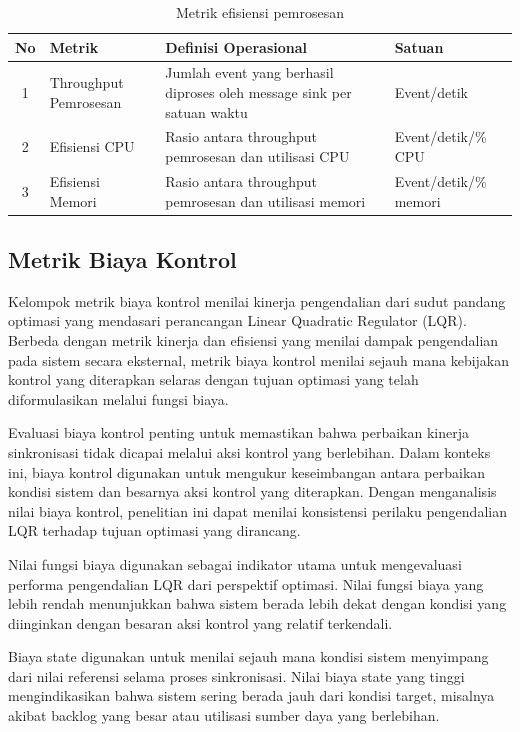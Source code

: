 \begin{table}[H]
    \centering
    \caption{Metrik efisiensi pemrosesan}
    \label{tab:metrik-efisiensi}
    \renewcommand{\arraystretch}{1.4}
    \begin{tabular}{|c|p{3cm}|p{6cm}|p{2.5cm}|}
    \hline
    \textbf{No} & \textbf{Metrik} & \textbf{Definisi Operasional} & \textbf{Satuan} \\
    \hline
    1 & Throughput Pemrosesan & Jumlah event yang berhasil diproses oleh message sink per satuan waktu & Event/detik \\
    \hline
    2 & Efisiensi CPU & Rasio antara throughput pemrosesan dan utilisasi CPU & Event/detik/\% CPU \\
    \hline
    3 & Efisiensi Memori & Rasio antara throughput pemrosesan dan utilisasi memori & Event/detik/\% memori \\
    \hline
    \end{tabular}
\end{table}

\subsection{Metrik Biaya Kontrol}

Kelompok metrik biaya kontrol menilai kinerja pengendalian dari sudut pandang optimasi yang mendasari perancangan Linear Quadratic Regulator (LQR).
Berbeda dengan metrik kinerja dan efisiensi yang menilai dampak pengendalian pada sistem secara eksternal, metrik biaya kontrol menilai sejauh mana kebijakan kontrol yang diterapkan selaras dengan tujuan optimasi yang telah diformulasikan melalui fungsi biaya.

Evaluasi biaya kontrol penting untuk memastikan bahwa perbaikan kinerja sinkronisasi tidak dicapai melalui aksi kontrol yang berlebihan.
Dalam konteks ini, biaya kontrol digunakan untuk mengukur keseimbangan antara perbaikan kondisi sistem dan besarnya aksi kontrol yang diterapkan.
Dengan menganalisis nilai biaya kontrol, penelitian ini dapat menilai konsistensi perilaku pengendalian LQR terhadap tujuan optimasi yang dirancang.

Nilai fungsi biaya digunakan sebagai indikator utama untuk mengevaluasi performa pengendalian LQR dari perspektif optimasi.
Nilai fungsi biaya yang lebih rendah menunjukkan bahwa sistem berada lebih dekat dengan kondisi yang diinginkan dengan besaran aksi kontrol yang relatif terkendali.

Biaya state digunakan untuk menilai sejauh mana kondisi sistem menyimpang dari nilai referensi selama proses sinkronisasi.
Nilai biaya state yang tinggi mengindikasikan bahwa sistem sering berada jauh dari kondisi target, misalnya akibat backlog yang besar atau utilisasi sumber daya yang berlebihan.

